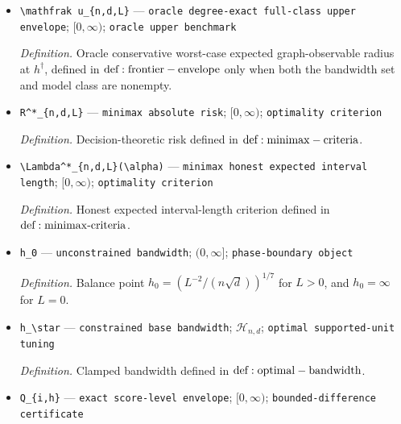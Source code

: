 \documentclass{article}
\begin{document}
\begin{itemize}
  \par\smallskip\noindent\emph{Definition.} Oracle full-class radius-minimizing bandwidth, defined in \({\rm def:exact-optimal-bandwidth}\) only when both the bandwidth set and model class are nonempty.
  \item \texttt{\textbackslash{}\allowbreak{}mathfrak u\_\allowbreak{}\{n,\allowbreak{}d,\allowbreak{}L\}\allowbreak{}} --- \texttt{oracle degree-\allowbreak{}exact full-\allowbreak{}class upper envelope}; \([0,\infty)\); \texttt{oracle upper benchmark}
  \par\smallskip\noindent\emph{Definition.} Oracle conservative worst-case expected graph-observable radius at \(h^\dagger\), defined in \({\rm def:frontier-envelope}\) only when both the bandwidth set and model class are nonempty.
  \item \texttt{R\textasciicircum{}*\_\allowbreak{}\{n,\allowbreak{}d,\allowbreak{}L\}\allowbreak{}} --- \texttt{minimax absolute risk}; \([0,\infty)\); \texttt{optimality criterion}
  \par\smallskip\noindent\emph{Definition.} Decision-theoretic risk defined in \({\rm def:minimax-criteria}\).
  \item \texttt{\textbackslash{}\allowbreak{}Lambda\textasciicircum{}*\_\allowbreak{}\{n,\allowbreak{}d,\allowbreak{}L\}\allowbreak{}(\textbackslash{}\allowbreak{}alpha)} --- \texttt{minimax honest expected interval length}; \([0,\infty)\); \texttt{optimality criterion}
  \par\smallskip\noindent\emph{Definition.} Honest expected interval-length criterion defined in \({\rm def:minimax\text{-}criteria}\).
  \item \texttt{h\_\allowbreak{}0} --- \texttt{unconstrained bandwidth}; \((0,\infty]\); \texttt{phase-\allowbreak{}boundary object}
  \par\smallskip\noindent\emph{Definition.} Balance point \(h_0=(L^{-2}/(n\sqrt d))^{1/7}\) for \(L>0\), and \(h_0=\infty\) for \(L=0\).
  \item \texttt{h\_\allowbreak{}\textbackslash{}\allowbreak{}star} --- \texttt{constrained base bandwidth}; \(\mathcal H_{n,d}\); \texttt{optimal supported-\allowbreak{}unit tuning}
  \par\smallskip\noindent\emph{Definition.} Clamped bandwidth defined in \({\rm def:optimal-bandwidth}\).
  \item \texttt{Q\_\allowbreak{}\{i,\allowbreak{}h\}\allowbreak{}} --- \texttt{exact score-\allowbreak{}level envelope}; \([0,\infty)\); \texttt{bounded-\allowbreak{}difference certificate}

\end{itemize}
\end{document}
